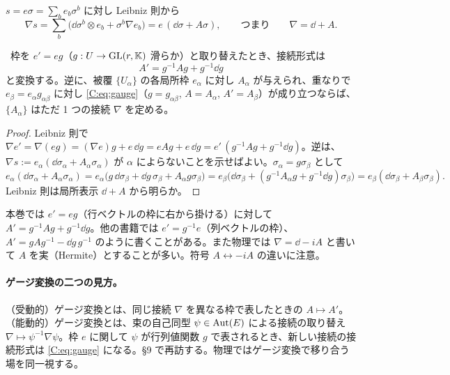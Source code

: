 $s=e\sigma=\sum_be_b\sigma^b$ に対し Leibniz 則から
\begin{equation}\label{C:eq:locnabla}
\nabla s=\sum_b\bigl(\dd\sigma^b\otimes e_b+\sigma^b\nabla e_b\bigr)=e\,(\dd\sigma+A\sigma),\qquad\text{つまり}\qquad\nabla=\dd+A.
\end{equation}
\begin{prop}[ゲージ変換則]\label{C:prop:gauge}\tP\
枠を $e'=eg$（$g:U\to\mathrm{GL}(r,\mathbb K)$ 滑らか）と取り替えたとき、接続形式は
\begin{equation}\label{C:eq:gauge}
A'=g^{-1}Ag+g^{-1}\dd g
\end{equation}
と変換する。逆に、被覆 $\{U_\alpha\}$ の各局所枠 $e_\alpha$ に対し $A_\alpha$ が与えられ、重なりで $e_\beta=e_\alpha g_{\alpha\beta}$ に対し \eqref{C:eq:gauge}（$g=g_{\alpha\beta}$, $A=A_\alpha$, $A'=A_\beta$）が成り立つならば、$\{A_\alpha\}$ はただ 1 つの接続 $\nabla$ を定める。
\end{prop}
\begin{proof}
Leibniz 則で $\nabla e'=\nabla(eg)=(\nabla e)g+e\,\dd g=eAg+e\,\dd g=e'\,(g^{-1}Ag+g^{-1}\dd g)$。逆は、$\nabla s:=e_\alpha(\dd\sigma_\alpha+A_\alpha\sigma_\alpha)$ が $\alpha$ によらないことを示せばよい。$\sigma_\alpha=g\sigma_\beta$ として
\[
e_\alpha(\dd\sigma_\alpha+A_\alpha\sigma_\alpha)=e_\alpha\bigl(g\,\dd\sigma_\beta+\dd g\,\sigma_\beta+A_\alpha g\sigma_\beta\bigr)=e_\beta\bigl(\dd\sigma_\beta+(g^{-1}A_\alpha g+g^{-1}\dd g)\sigma_\beta\bigr)=e_\beta(\dd\sigma_\beta+A_\beta\sigma_\beta).
\]
Leibniz 則は局所表示 $\dd+A$ から明らか。
\end{proof}
\begin{rem}[符号と規約]
本巻では $e'=eg$（行ベクトルの枠に右から掛ける）に対して $A'=g^{-1}Ag+g^{-1}\dd g$。他の書籍では $e'=g^{-1}e$（列ベクトルの枠）、$A'=gAg^{-1}-\dd g\,g^{-1}$ のように書くことがある。また物理では $\nabla=\dd-iA$ と書いて $A$ を実（Hermite）とすることが多い。符号 $A\leftrightarrow -iA$ の違いに注意。
\end{rem}
\paragraph{ゲージ変換の二つの見方。}（受動的）ゲージ変換とは、同じ接続 $\nabla$ を異なる枠で表したときの $A\mapsto A'$。（能動的）ゲージ変換とは、束の自己同型 $\psi\in\operatorname{Aut}(E)$ による接続の取り替え $\nabla\mapsto\psi^{-1}\nabla\psi$。枠 $e$ に関して $\psi$ が行列値関数 $g$ で表されるとき、新しい接続の接続形式は \eqref{C:eq:gauge} になる。§9 で再訪する。物理ではゲージ変換で移り合う場を同一視する。

